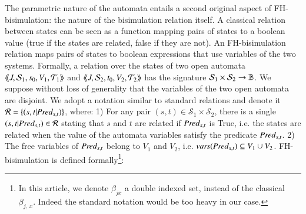 \documentclass{elsarticle}
\begin{document}
The parametric nature of the automata entails a second original aspect of FH-bisimulation: the nature of the bisimulation relation itself.
 A classical relation between states can be seen as a function mapping pairs of states to a boolean value (true if the states are related, false if they are not). An FH-bisimulation relation maps pairs of states to boolean expressions that use variables of the two systems.  %
Formally, a relation over the states of two open automata  $\langle\hspace{-0.45ex}\langle J,\mathcal{S}_1, s_0,V_1,
   \mathcal{T}_1 \rangle\hspace{-0.45ex}\rangle$ and $\langle\hspace{-0.45ex}\langle J,\mathcal{S}_2,t_0,V_2, \mathcal{T}_2 \rangle\hspace{-0.45ex}\rangle$ has the signature $\mathcal{S}_1\times\mathcal{S}_2\to\mathbb{B}$. 
We suppose without loss of generality that the variables of the two open automata are disjoint.
We adopt a notation similar to standard relations and denote it
 $\mathcal{R}=\{(s,t|\Pred_{s,t})\}$, where: 1) For any pair $(s,t)\in \mathcal{S}_1\times \mathcal{S}_2$, there is a 
   single
      $(s,t|\Pred_{s,t})\in\mathcal{R}$  stating that $s$ and $t$ are related 
      if $\Pred_{s,t}$       is 
      True, i.e. the states are related when the value of the automata variables %
  satisfy the predicate $\Pred_{s,t}$. 2) The free variables of  $\Pred_{s,t}$ belong to $V_1$ and $V_2$, i.e. $\vars(\Pred_{s,t})\subseteq V_1\cup V_2$.
 FH-bisimulation is defined formally\footnote{In this article, we denote $\beta_{j x}$  a double indexed set, instead of the classical $\beta_{j,\, x}$. Indeed the standard notation would be too heavy in our case.}: 
\end{document}
